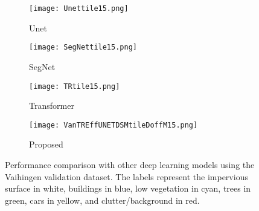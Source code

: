 \documentclass[journal]{IEEEtran}
\begin{document}
\begin{figure*}[hptb]
\begin{subfigure}{.11\textwidth}
   \texttt{[image: Unettile15.png]}
   \caption{Unet}
\end{subfigure}
\hfill
\begin{subfigure}{.11\textwidth}
   \texttt{[image: SegNettile15.png]}
   \caption{SegNet}
\end{subfigure}
\hfill
\begin{subfigure}{.11\textwidth}
   \texttt{[image: TRtile15.png]}
   \caption{Transformer}
\end{subfigure}
\hfill
\begin{subfigure}{.11\textwidth}
   \texttt{[image: VanTREffUNETDSMtileDoffM15.png]}
   \caption{Proposed}
\end{subfigure}

\caption{Performance comparison with other deep learning models using the Vaihingen validation dataset. The labels represent the impervious surface in white, buildings in blue, low vegetation in cyan, trees in green, cars in yellow, and clutter/background in red.}
\label{fig: 7}
\end{figure*}
\end{document}

